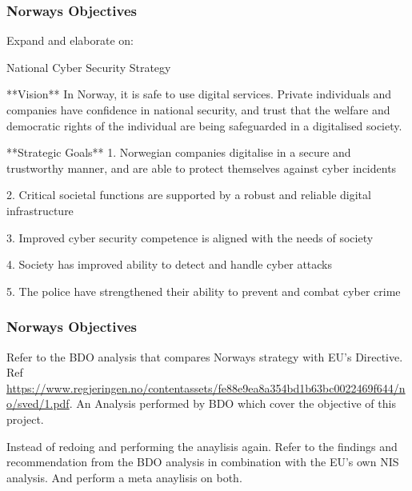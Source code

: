 \subsubsection{Norways Objectives}

\begin{followup}
    Expand and elaborate on:

    National Cyber Security Strategy

        **Vision**
        In Norway, it is safe to use digital services. Private
        individuals and companies have confidence in national
        security, and trust that the welfare and democratic rights
        of the individual are being safeguarded in a digitalised
        society.

        **Strategic Goals**
        1. Norwegian companies digitalise in a secure and
        trustworthy manner, and are able to protect themselves
        against cyber incidents

        2. Critical societal functions are supported by a robust and
        reliable digital infrastructure
        
        3. Improved cyber security competence is aligned with the
        needs of society
        
        4. Society has improved ability to detect and handle cyber
        attacks
        
        5. The police have strengthened their ability to prevent
        and combat cyber crime
\end{followup}


\subsubsection{Norways Objectives}

\begin{followup}
    Refer to the BDO analysis that compares Norways strategy with EU's Directive. Ref \url{https://www.regjeringen.no/contentassets/fe88e9ea8a354bd1b63bc0022469f644/no/sved/1.pdf}. An Analysis performed by BDO which cover the objective of this project.

    Instead of redoing and performing the anaylisis again. Refer to the findings and recommendation from the BDO analysis in combination with the EU's own NIS analysis. And perform a meta anaylisis on both.
\end{followup}